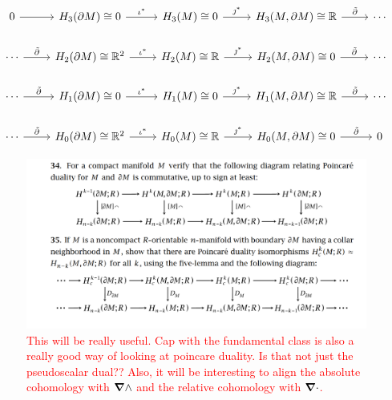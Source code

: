 \documentclass{article}
\begin{document}
\[
\begin{tikzcd}
0 \arrow[r]                          & H_3(\partial M)\cong 0 \arrow[r, "\iota^*"]            & H_3(M)\cong 0 \arrow[r, "\jmath^*"]           & {H_3(M,\partial M)\cong \mathbb{R}} \arrow[r, "\tilde{\partial}"] & \cdots \\
\cdots \arrow[r, "\tilde{\partial}"] & H_2(\partial M)\cong \mathbb{R}^2 \arrow[r, "\iota^*"] & H_2(M) \cong \mathbb{R} \arrow[r, "\jmath^*"] & {H_2(M,\partial M)\cong 0} \arrow[r, "\tilde{\partial}"]          & \cdots \\
\cdots \arrow[r, "\tilde{\partial}"] & H_1(\partial M)\cong 0 \arrow[r, "\iota^*"]   & H_1(M)\cong 0 \arrow[r, "\jmath^*"]           & {H_1(M,\partial M)\cong \mathbb{R}} \arrow[r, "\tilde{\partial}"] & \cdots \\
\cdots \arrow[r, "\tilde{\partial}"] & H_0(\partial M)\cong \mathbb{R}^2 \arrow[r, "\iota^*"] & H_0(M)\cong \mathbb{R} \arrow[r, "\jmath^*"]  & {H_0(M,\partial M)\cong 0} \arrow[r, "\tilde{\partial}"]          & 0     
\end{tikzcd}
\]
\begin{figure}
    \centering
    \includegraphics[width=\textwidth]{figures/cap_fundamental_class.png}
    \caption{\textcolor{red}{This will be really useful. Cap with the fundamental class is also a really good way of looking at poincare duality. Is that not just the pseudoscalar dual?? Also, it will be interesting to align the absolute cohomology with $\boldsymbol{\nabla} \wedge$ and the relative cohomology with $\boldsymbol{\nabla} \cdot$.}}
\end{figure}
\end{document}
